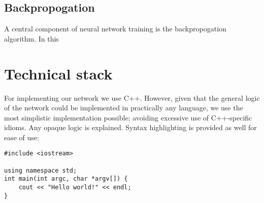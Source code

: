 \documentclass{article}
\begin{document}

\subsection{Backpropogation}
A central component of neural network training is the backpropogation algorithm. In this

\section{Technical stack}
For implementing our network we use C++. However, given that the general logic of the network could be implemented in practically any language, we use the most simplistic implementation possible; avoiding excessive use of C++-specific idioms. Any opaque logic is explained. Syntax highlighting is provided as well for ease of use:
\begin{verbatim}
#include <iostream>

using namespace std;
int main(int argc, char *argv[]) {
    cout << "Hello world!" << endl;
}
\end{verbatim}


\end{document}

